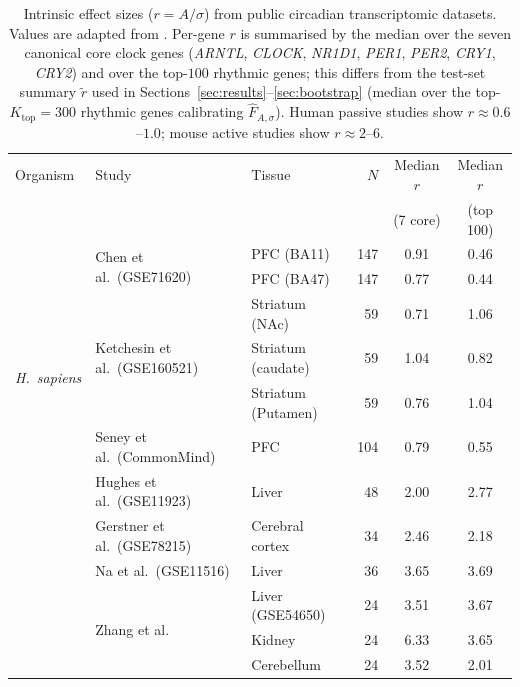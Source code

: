 \documentclass{article}
\begin{document}
\begin{table}[!htbp]
\centering
\footnotesize
\setlength{\tabcolsep}{4pt}
\begin{tabular}{ll|lrcc}
\toprule
Organism & Study & Tissue & $N$ & \multicolumn{1}{c}{Median $r$} & \multicolumn{1}{c}{Median $r$} \\
 & & & & \multicolumn{1}{c}{(7 core)} & \multicolumn{1}{c}{(top 100)} \\
\midrule
\multirow{7}{*}{\textit{H.\ sapiens}} & \multirow{2}{*}{Chen et al.\ (GSE71620) \citep{chen2016aging}} & PFC (BA11) & 147 & 0.91 & 0.46 \\
 & & PFC (BA47) & 147 & 0.77 & 0.44 \\
 & \multirow{3}{*}{Ketchesin et al.\ (GSE160521) \citep{ketchesin2021diurnal}} & Striatum (NAc) & 59 & 0.71 & 1.06 \\
 & & Striatum (caudate) & 59 & 1.04 & 0.82 \\
 & & Striatum (Putamen) & 59 & 0.76 & 1.04 \\
 & Seney et al.\ (CommonMind) \citep{seney2019diurnal} & PFC & 104 & 0.79 & 0.55 \\
\midrule
\multirow{6}{*}{\textit{M.\ musculus}} & Hughes et al.\ (GSE11923) \citep{hughes2009harmonics} & Liver & 48 & 2.00 & 2.77 \\
 & Gerstner et al.\ (GSE78215) \citep{gerstner2016removal} & Cerebral cortex & 34 & 2.46 & 2.18 \\
 & Na et al.\ (GSE11516) \citep{na2009comprehensive} & Liver & 36 & 3.65 & 3.69 \\
 & \multirow{3}{*}{Zhang et al.\ \citep{zhang2014comprehensive}} & Liver (GSE54650) & 24 & 3.51 & 3.67 \\
 & & Kidney & 24 & 6.33 & 3.65 \\
 & & Cerebellum & 24 & 3.52 & 2.01 \\
\bottomrule
\end{tabular}
\caption{Intrinsic effect sizes ($r = A/\sigma$) from public circadian
transcriptomic datasets. Values are adapted from \citep{zong2023circapower}.
Per-gene $r$ is summarised by the median over the seven canonical
core clock genes (\textit{ARNTL}, \textit{CLOCK}, \textit{NR1D1},
\textit{PER1}, \textit{PER2}, \textit{CRY1}, \textit{CRY2}) and over
the top-$100$ rhythmic genes; this differs from the test-set summary
$\tilde{r}$ used in Sections~\ref{sec:results}--\ref{sec:bootstrap}
(median over the top-$K_{\mathrm{top}} = 300$ rhythmic genes
calibrating $\hat{F}_{A,\sigma}$). Human passive studies show
$r \approx 0.6$--$1.0$; mouse active studies show $r \approx 2$--$6$.}
\label{tab:effect_sizes}
\end{table}
\end{document}
